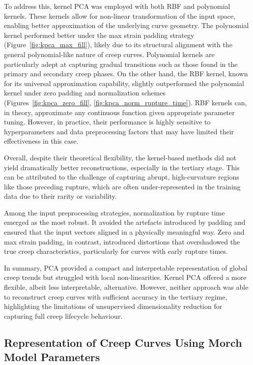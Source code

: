 \documentclass[class=scrbook, crop=false]{standalone}
\begin{document}
To address this, kernel PCA was employed with both RBF and polynomial kernels. These kernels allow for non-linear transformation of the input space, enabling better approximation of the underlying curve geometry. The polynomial kernel performed better under the max strain padding strategy (Figure~\ref{fig:kpca_max_fill}), likely due to its structural alignment with the general polynomial-like nature of creep curves. Polynomial kernels are particularly adept at capturing gradual transitions such as those found in the primary and secondary creep phases. On the other hand, the RBF kernel, known for its universal approximation capability, slightly outperformed the polynomial kernel under zero padding and normalization schemes (Figures~\ref{fig:kpca_zero_fill}, \ref{fig:kpca_norm_rupture_time}). RBF kernels can, in theory, approximate any continuous function given appropriate parameter tuning. However, in practice, their performance is highly sensitive to hyperparameters and data preprocessing factors that may have limited their effectiveness in this case.

Overall, despite their theoretical flexibility, the kernel-based methods did not yield dramatically better reconstructions, especially in the tertiary stage. This can be attributed to the challenge of capturing abrupt, high-curvature regions like those preceding rupture, which are often under-represented in the training data due to their rarity or variability.

Among the input preprocessing strategies, normalization by rupture time emerged as the most robust. It avoided the artefacts introduced by padding and ensured that the input vectors aligned in a physically meaningful way. Zero and max strain padding, in contrast, introduced distortions that overshadowed the true creep characteristics, particularly for curves with early rupture times.

In summary, PCA provided a compact and interpretable representation of global creep trends but struggled with local non-linearities. Kernel PCA offered a more flexible, albeit less interpretable, alternative. However, neither approach was able to reconstruct creep curves with sufficient accuracy in the tertiary regime, highlighting the limitations of unsupervised dimensionality reduction for capturing full creep lifecycle behaviour.



\subsection{Representation of Creep Curves Using Morch Model Parameters}
\end{document}
